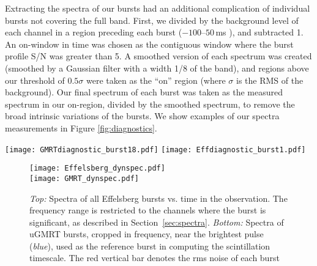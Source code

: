 \documentclass[fleqn,usenatbib]{mnras}
\begin{document}
Extracting the spectra of our bursts had an additional complication of individual bursts not covering the full band.  First, we divided by the background level of each channel in a region preceding each burst ($-100$--$50\,$ms ), and subtracted 1.  
An on-window in time was chosen as the contiguous window where the burst profile S/N was greater than 5.
A smoothed version of each spectrum was created (smoothed by a Gaussian filter with a width 1/8 of the band), and regions above our threshold of $0.5\sigma$ were taken as the ``on'' region (where $\sigma$ is the RMS of the background).  Our final spectrum of each burst was taken as the measured spectrum in our on-region, divided by the smoothed spectrum, to remove the broad intrinsic variations of the bursts.  
We show examples of our spectra measurements in Figure \ref{fig:diagnostics}.

\begin{figure*}
    \centering
    \texttt{[image: GMRTdiagnostic\_burst18.pdf]}
    \texttt{[image: Effdiagnostic\_burst1.pdf]}
    \vspace{-3mm}
    \caption{Diagnostic plots showing how spectra are created, with examples from uGMRT \textit{(left)} and Effelsberg \textit{(right)}. Images show the dynamic spectrum of each burst.  Top panels show the frequency averaged profile in blue, while the red dotted lines enclose the on-window containing the burst. Right panels show the spectrum (blue), and the spectrum smoothed by a Gaussian filter with a width of 1/8 of the total bandwidth. Red lines are at $0.5 \times$ the RMS noise of the background; the ``on'' region of each spectrum is determined as the channels where the smoothed spectrum is above the red line.
    }
    \label{fig:diagnostics}
\end{figure*}

\begin{figure}
    \centering
    \texttt{[image: Effelsberg\_dynspec.pdf]} \\
    \texttt{[image: GMRT\_dynspec.pdf]}
    \caption{\textit{Top:} Spectra of all Effelsberg bursts vs. time in the observation. The frequency range is restricted to the channels where the burst is significant, as described in Section~\ref{sec:spectra}.   \textit{Bottom:} Spectra of uGMRT bursts, cropped in frequency, near the brightest pulse (\textit{blue}), used as the reference burst in computing the scintillation timescale. The red vertical bar denotes the rms noise of each burst }
    \label{fig:dynamic_spectra}
\end{figure}
\end{document}
